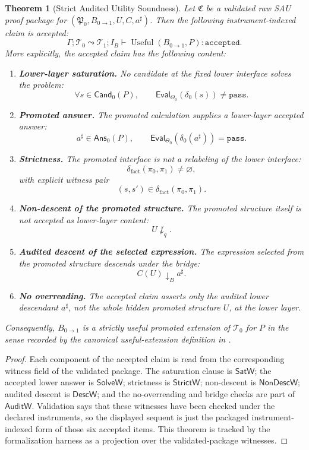 \documentclass[11pt]{article}
\newtheorem{theorem}{Theorem}[section]
\theoremstyle{definition}
\begin{document}
\begin{theorem}[Strict Audited Utility Soundness]
\label{thm:sau-soundness}
Let \(\mathfrak C\) be a validated raw SAU proof package for
\((\mathfrak P_0,B_{0\to1},U,C,a^\sharp)\).  Then the following instrument-indexed claim is accepted:
\[
\Gamma;\mathcal T_0\leadsto\mathcal T_1;I_B
\vdash
\operatorname{Useful}(B_{0\to1},P):\texttt{accepted}.
\]
More explicitly, the accepted claim has the following content:
\begin{enumerate}
\item \textbf{Lower-layer saturation.} No candidate at the fixed lower interface solves the problem:
\[
\forall s\in\mathsf{Cand}_0(P),
\qquad
\mathsf{Eval}_{\Theta_0}(\delta_0(s))\neq\texttt{pass}.
\]
\item \textbf{Promoted answer.} The promoted calculation supplies a lower-layer accepted answer:
\[
a^\sharp\in\mathsf{Ans}_0(P),
\qquad
\mathsf{Eval}_{\Theta_0}(\delta_0(a^\sharp))=\texttt{pass}.
\]
\item \textbf{Strictness.} The promoted interface is not a relabeling of the lower interface:
\[
\delta_{\mathrm{fact}}(\pi_0,\pi_1)\neq\varnothing,
\]
with explicit witness pair
\[
(s,s')\in\delta_{\mathrm{fact}}(\pi_0,\pi_1).
\]
\item \textbf{Non-descent of the promoted structure.} The promoted structure itself is not accepted as lower-layer content:
\[
U\not\downarrow_q.
\]
\item \textbf{Audited descent of the selected expression.} The expression selected from the promoted structure descends under the bridge:
\[
C(U)\downarrow_B a^\sharp.
\]
\item \textbf{No overreading.} The accepted claim asserts only the audited lower descendant \(a^\sharp\), not the whole hidden promoted structure \(U\), at the lower layer.
\end{enumerate}
Consequently, \(B_{0\to1}\) is a strictly useful promoted extension of \(\mathcal T_0\) for \(P\) in the sense recorded by the canonical useful-extension definition in .
\end{theorem}

\begin{proof}
Each component of the accepted claim is read from the corresponding witness
field of the validated package.  The saturation clause is \(\mathsf{SatW}\);
the accepted lower answer is \(\mathsf{SolveW}\); strictness is
\(\mathsf{StrictW}\); non-descent is \(\mathsf{NonDescW}\); audited descent is
\(\mathsf{DescW}\); and the no-overreading and bridge checks are part of
\(\mathsf{AuditW}\).  Validation says that these witnesses have been checked
under the declared instruments, so the displayed sequent is just the packaged
instrument-indexed form of those six accepted items.  This theorem is tracked
by the formalization harness as a projection over the validated-package
witnesses.
\end{proof}
\end{document}
